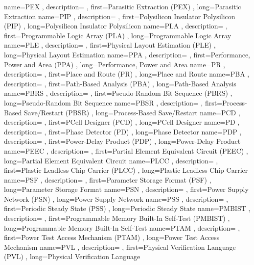 { name={PEX}
, description={}
, first={Parasitic Extraction (PEX)}
, long={Parasitic Extraction}
}
{ name={PIP}
, description={}
, first={Polysilicon Insulator Polysilicon (PIP)}
, long={Polysilicon Insulator Polysilicon}
}
{ name={PLA}
, description={}
, first={Programmable Logic Array (PLA)}
, long={Programmable Logic Array}
}
{ name={PLE}
, description={}
, first={Physical Layout Estimation (PLE)}
, long={Physical Layout Estimation}
}
{ name={PPA}
, description={}
, first={Performance, Power and Area (PPA)}
, long={Performance, Power and Area}
}
{ name={PR}
, description={}
, first={Place and Route (PR)}
, long={Place and Route}
}
{ name={PBA}
, description={}
, first={Path-Based Analysis (PBA)}
, long={Path-Based Analysis}
}
{ name={PBRS}
, description={}
, first={Pseudo-Random Bit Sequence (PBRS)}
, long={Pseudo-Random Bit Sequence}
}
{ name={PBSR}
, description={}
, first={Process-Based Save/Restart (PBSR)}
, long={Process-Based Save/Restart}
}
{ name={PCD}
, description={}
, first={PCell Designer (PCD)}
, long={PCell Designer}
}
{ name={PD}
, description={}
, first={Phase Detector (PD)}
, long={Phase Detector}
}
{ name={PDP}
, description={}
, first={Power-Delay Product (PDP)}
, long={Power-Delay Product}
}
{ name={PEEC}
, description={}
, first={Partial Element Equivalent Circuit (PEEC)}
, long={Partial Element Equivalent Circuit}
}
{ name={PLCC}
, description={}
, first={Plastic Leadless Chip Carrier (PLCC)}
, long={Plastic Leadless Chip Carrier}
}
{ name={PSF}
, description={}
, first={Parameter Storage Format (PSF)}
, long={Parameter Storage Format}
}
{ name={PSN}
, description={}
, first={Power Supply Network (PSN)}
, long={Power Supply Network}
}
{ name={PSS}
, description={}
, first={Periodic Steady State (PSS)}
, long={Periodic Steady State}
}
{ name={PMBIST}
, description={}
, first={Programmable Memory Built-In Self-Test (PMBIST)}
, long={Programmable Memory Built-In Self-Test}
}
{ name={PTAM}
, description={}
, first={Power Test Access Mechanism (PTAM)}
, long={Power Test Access Mechanism}
}
{ name={PVL}
, description={}
, first={Physical Verification Language (PVL)}
, long={Physical Verification Language}
}
